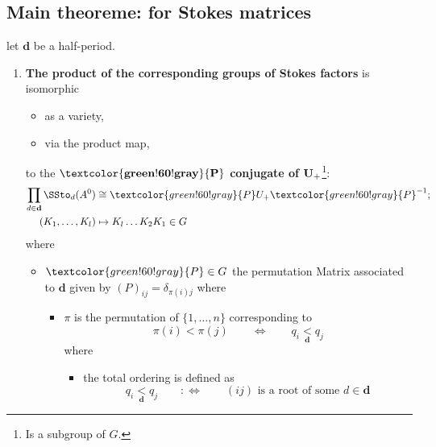 \subsection{Main theoreme: for Stokes matrices}
\begin{lem}
  let $\textbf{d}$ be a half-period.
  \begin{enumerate}
    \def\myP{\textcolor{green!60!gray}{P}}
    \item \textbf{The product of the corresponding groups of Stokes factors}
      is isomorphic
      \begin{itemize}
        \item as a variety,
        \item via the product map,
      \end{itemize}
      to the \textbf{$\bf \myP$ conjugate of $\bf U_+$}\footnote{Is a subgroup
      of $G$.}:
      \begin{align*}
        \prod_{d\in\textbf{d}}\SSto_d(A^0)&\cong \myP U_+\myP^{-1} ;
        \\(K_1,\dots,K_l)&\mapsto K_l\dots K_2K_1\in G
      \end{align*}
      where
      \begin{itemize}
        \item $\myP\in G$ the permutation Matrix associated to $\textbf{d}$
          given by $(P)_{ij}=\delta_{\pi(i)j}$ where
          \begin{itemize}
            \item
              $\pi$ is the permutation of $\{1,\dots,n\}$ corresponding to
              \[
                \pi(i)<\pi(j)
                \qquad \Leftrightarrow \qquad
                q_i\underset{\textbf{d}}{<}q_j
              \]
              where
              \begin{itemize}
                \item the total ordering is defined as
                  \[
                    q_i\underset{\textbf{d}}{<}q_j \qquad :\Leftrightarrow
                    \qquad (ij) \text{ is a root of some } d\in\textbf{d}
                  \]
              \end{itemize}
          \end{itemize}
      \end{itemize}
      \begin{comment}
        See \cite[13]{thboalch}: \textbf{Proof of Proposition 1.35}
      \end{comment}
  \end{enumerate}
\end{lem}
